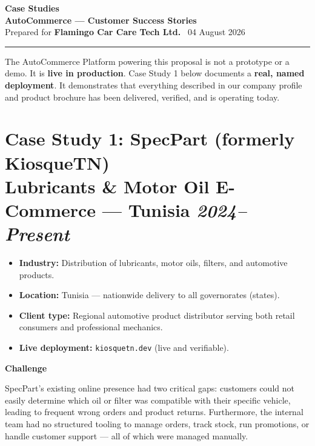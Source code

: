 \documentclass[11pt,a4paper]{article}
\begin{document}
\begin{center}
  {\Huge\bfseries\color{accent}Case Studies}\\[0.4em]
  {\large\bfseries AutoCommerce --- Customer Success Stories}\\[0.2em]
  {\normalsize\color{gray}Prepared for \textbf{Flamingo Car Care Tech
  Ltd.} \textbar\ 04 August 2026}\\[1.2em]
  \rule{\textwidth}{1.2pt}
\end{center}

\noindent The AutoCommerce Platform powering this proposal is not a
prototype or a demo. It is \textbf{live in production}. Case Study 1
below documents a \textbf{real, named deployment}. It demonstrates
that everything described in our company profile and product brochure
has been delivered, verified, and is operating today.

\bigskip

\section*{Case Study 1: SpecPart (formerly KiosqueTN)\\
  \small\normalfont\color{subaccent}Lubricants \& Motor Oil
  E-Commerce --- Tunisia \hfill \textit{2024--Present}}

\begin{itemize}[leftmargin=1.4em,itemsep=4pt]
  \item \textbf{Industry:} Distribution of lubricants, motor oils,
        filters, and automotive products.
  \item \textbf{Location:} Tunisia --- nationwide delivery to all
        governorates (states).
  \item \textbf{Client type:} Regional automotive product distributor
        serving both retail consumers and professional mechanics.
  \item \textbf{Live deployment:} \texttt{kiosquetn.dev} (live and
        verifiable).
\end{itemize}

\medskip
\noindent\textbf{Challenge}

SpecPart's existing online presence had two critical gaps: customers
could not easily determine which oil or filter was compatible with
their specific vehicle, leading to frequent wrong orders and product
returns. Furthermore, the internal team had no structured tooling to
manage orders, track stock, run promotions, or handle customer
support --- all of which were managed manually.
\end{document}
